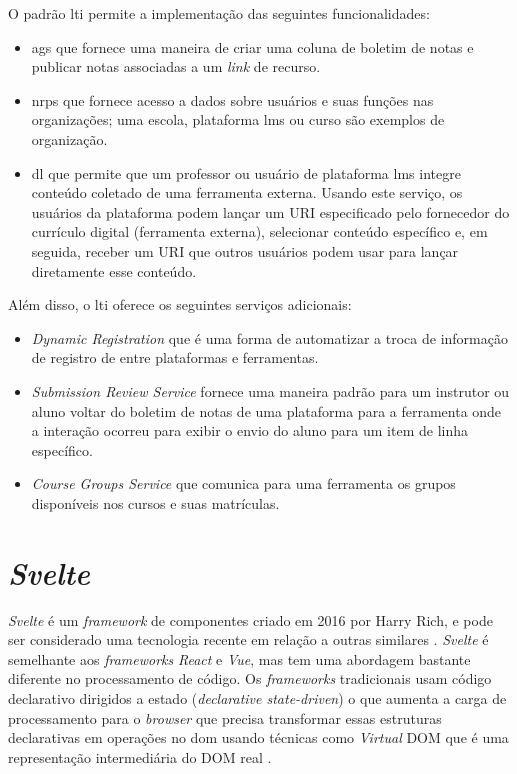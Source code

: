 O padrão \gls{lti} permite a implementação das seguintes funcionalidades:
\begin{itemize}[label=$\sbullet$]
    \item \gls{ags} que fornece uma maneira de criar uma coluna de boletim de notas e publicar notas associadas a um \textit{link} de recurso.
    \item \gls{nrps} que fornece acesso a dados sobre usuários e suas funções nas organizações; uma escola, plataforma \gls{lms} ou curso são exemplos de organização.
    \item \gls{dl} que permite que um professor ou usuário de plataforma \gls{lms} integre conteúdo coletado de uma ferramenta externa. Usando este serviço, os usuários da plataforma podem lançar um URI especificado pelo fornecedor do currículo digital (ferramenta externa), selecionar conteúdo específico e, em seguida, receber um URI que outros usuários podem usar para lançar diretamente esse conteúdo.
\end{itemize}

Além disso, o \gls{lti} oferece os seguintes serviços adicionais:

\begin{itemize}[label=$\sbullet$]
    \item \textit{Dynamic Registration} que é uma forma de automatizar a troca de informação de registro de entre plataformas e ferramentas.
    \item \textit{Submission Review Service} fornece uma maneira padrão para um instrutor ou aluno voltar do boletim de notas de uma plataforma para a ferramenta onde a interação ocorreu para exibir o envio do aluno para um item de linha específico.
    \item \textit{Course Groups Service} que comunica para uma ferramenta os grupos disponíveis nos cursos e suas matrículas.
\end{itemize}

\section{\textit{Svelte}}
\textit{Svelte} é um \textit{framework} de componentes criado em 2016 por Harry Rich, e pode ser considerado uma tecnologia recente em relação a outras similares \cite{krill_slim_2016}. \textit{Svelte} é semelhante aos \textit{frameworks} \textit{React} e \textit{Vue}, mas tem uma abordagem bastante diferente no processamento de código. Os \textit{frameworks} tradicionais usam código declarativo dirigidos a estado (\textit{declarative state-driven}) o que aumenta a carga de processamento para o \textit{browser} que precisa transformar essas estruturas declarativas em operações no \gls{dom} usando técnicas como \textit{Virtual} DOM que é uma representação intermediária do DOM real \cite{harris_svelte_2019}.

